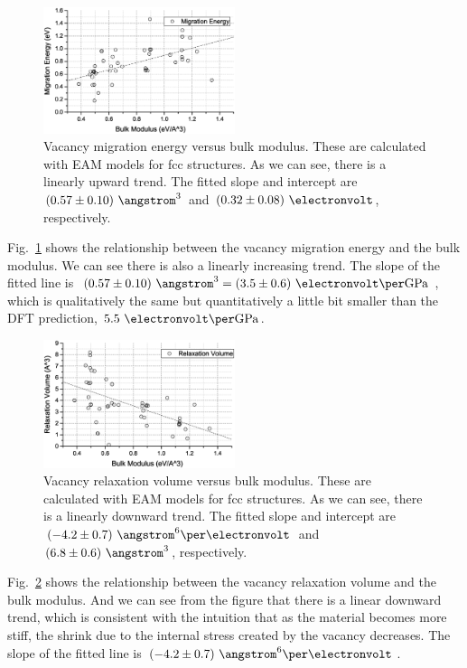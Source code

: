 \documentclass[%
 reprint,
 amsmath,amssymb,
 aps,
]{revtex4-1}
\begin{document}
\begin{figure}
\centering
\includegraphics[width=0.5\textwidth, clip, trim = 10mm 3mm 10mm 10mm]{vme_vs_bulk}%
\caption{\label{fig:vmevsbulk}
Vacancy migration energy versus bulk modulus.
These are calculated with EAM models for fcc structures.
As we can see, there is a linearly upward trend.
The fitted slope and intercept are $(0.57\pm0.10)~\angstrom^3$ and $(0.32\pm0.08)~\electronvolt$, respectively.
}
\end{figure}

Fig.~\ref{fig:vmevsbulk} shows the relationship between the vacancy migration energy and the bulk modulus.
We can see there is also a linearly increasing trend.
The slope of the fitted line is $(0.57\pm0.10)~\angstrom^3 = (3.5\pm0.6)~\electronvolt\per\mathrm{GPa}$, which is qualitatively the same but quantitatively a little bit smaller than the DFT prediction, $5.5~\electronvolt\per\mathrm{GPa}$.

\begin{figure}
\centering
\includegraphics[width=0.5\textwidth, clip, trim = 10mm 3mm 10mm 10mm]{vrv_vs_bulk}%
\caption{\label{fig:vrvvsbulk}
Vacancy relaxation volume versus bulk modulus.
These are calculated with EAM models for fcc structures.
As we can see, there is a linearly downward trend.
The fitted slope and intercept are $(-4.2\pm0.7)~\angstrom^6\per\electronvolt$ and $(6.8\pm0.6)~\angstrom^3$, respectively.
}
\end{figure}

Fig.~\ref{fig:vrvvsbulk} shows the relationship between the vacancy relaxation volume and the bulk modulus.
And we can see from the figure that there is a linear downward trend, which is consistent with the intuition that as the material becomes more stiff, the shrink due to the internal stress created by the vacancy decreases.
The slope of the fitted line is $(-4.2\pm0.7)~\angstrom^6\per\electronvolt$.
\end{document}
